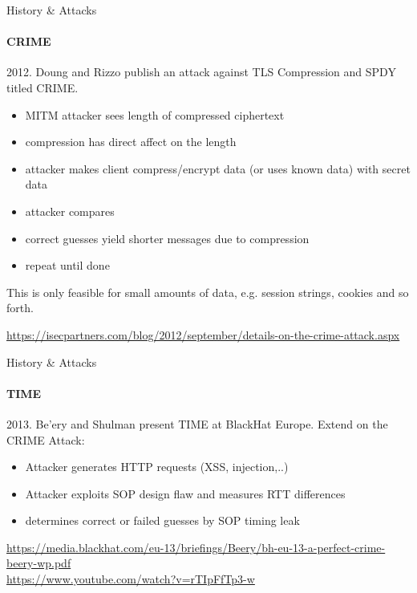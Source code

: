 \documentclass[hyperref={draft}]{beamer}
\begin{document}
\begin{frame}{History \& Attacks}
  \framesubtitle{CRIME}
  2012. Doung and Rizzo publish an attack against TLS Compression and SPDY titled CRIME.

  \begin{itemize}
    \item MITM attacker sees length of compressed ciphertext
    \item compression has direct affect on the length
    \item attacker makes client compress/encrypt data (or uses known data) with secret data
    \item attacker compares
    \item correct guesses yield shorter messages due to compression
    \item repeat until done
  \end{itemize}
  This is only feasible for small amounts of data, e.g. session strings, cookies and so forth.
  
  \vspace{10px}

  \tiny
  \url{https://isecpartners.com/blog/2012/september/details-on-the-crime-attack.aspx}
\end{frame}

\begin{frame}{History \& Attacks}
  \framesubtitle{TIME}
  2013. Be'ery and Shulman present TIME at BlackHat Europe. Extend on the CRIME Attack:
  \begin{itemize}
    \item Attacker generates HTTP requests (XSS, injection,..)
    \item Attacker exploits SOP design flaw and measures RTT differences
    \item determines correct or failed guesses by SOP timing leak
  \end{itemize}
  
  \vspace{70px}

  \tiny
  \url{https://media.blackhat.com/eu-13/briefings/Beery/bh-eu-13-a-perfect-crime-beery-wp.pdf}\\
  \url{https://www.youtube.com/watch?v=rTIpFfTp3-w}
\end{frame}
\end{document}
